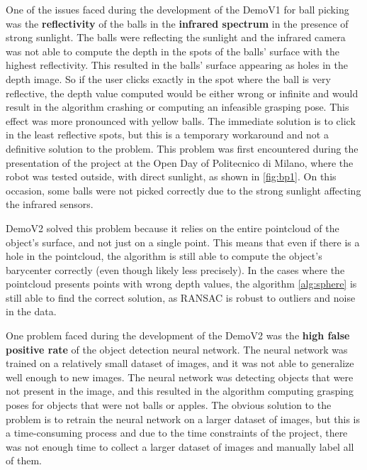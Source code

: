 One of the issues faced during the development of the DemoV1 for ball picking was the \textbf{reflectivity} of the balls
in the \textbf{infrared spectrum} in the presence of strong sunlight. The balls were reflecting the sunlight and the infrared
camera was not able to compute the depth in the spots of the balls' surface with the highest reflectivity. This resulted
in the balls' surface appearing as holes in the depth image. So if the user clicks exactly in the spot where
the ball is very reflective, the depth value computed would be either wrong or infinite and would result in the
algorithm crashing or computing an infeasible grasping pose. This effect was more pronounced with yellow balls.
The immediate solution is to click in the least reflective spots, but this is a temporary workaround and 
not a definitive solution to the problem. This problem was first encountered during the presentation of the project
at the Open Day of Politecnico di Milano, where the robot was tested outside, with direct sunlight, as shown in \ref{fig:bp1}.
On this occasion, some balls were not picked correctly due to the strong sunlight affecting the infrared sensors.

DemoV2 solved this problem because it relies on the entire pointcloud of the object's surface, and not just
on a single point. This means that even if there is a hole in the pointcloud, the algorithm is still able
to compute the object's barycenter correctly (even though likely less precisely).
In the cases where the pointcloud presents points with wrong depth values, the algorithm \ref{alg:sphere}
is still able to find the correct solution, as RANSAC is robust to outliers and noise in the data.

One problem faced during the development of the DemoV2 was the \textbf{high false positive rate} of the object
detection neural network. The neural network was trained on a relatively small dataset of images, and it was not able
to generalize well enough to new images. The neural network was detecting objects that were not present in the image,
and this resulted in the algorithm computing grasping poses for objects that were not balls or apples.
The obvious solution to the problem is to retrain the neural network on a larger dataset of images,
but this is a time-consuming process and due to the time constraints of the project, there was not enough
time to collect a larger dataset of images and manually label all of them. 

